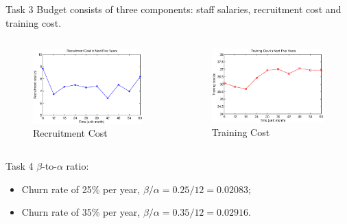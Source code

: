 \documentclass{beamer}
\begin{document}
\begin{CJK*}{UTF8}{gbsn}
\begin{frame}{Task 3}
Budget consists of three components: staff salaries, recruitment cost and training cost.
\begin{columns}
\begin{figure}
\centering
\includegraphics[width=1.0\textwidth]{fig/task-3-1.eps}
\caption{Recruitment Cost}
\end{figure}
\begin{figure}
\centering
\includegraphics[width=1.0\textwidth]{fig/task-3-2.eps}
\caption{Training Cost}
\end{figure}
\end{columns}

\end{frame}

\begin{frame}{Task 4}
$\beta$-to-$\alpha$ ratio: 
\begin{itemize}
\item Churn rate of 25\% per year, $\beta/\alpha = 0.25/12 = 0.02083$;
\item Churn rate of 35\% per year, $\beta/\alpha = 0.35/12 = 0.02916$.
\end{itemize}



\end{frame}
\end{CJK*}
\end{document}
